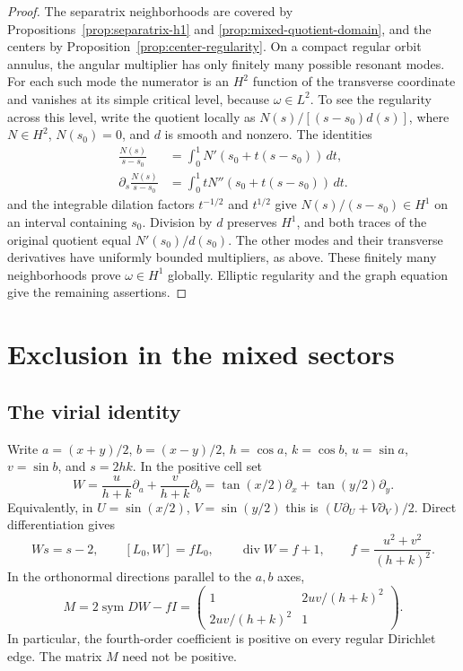 \documentclass[reqno,11pt]{amsart}
\numberwithin{equation}{section}
\theoremstyle{remark}
\begin{document}
\begin{proof}
The separatrix neighborhoods are covered by
Propositions~\ref{prop:separatrix-h1} and
\ref{prop:mixed-quotient-domain}, and the centers by
Proposition~\ref{prop:center-regularity}.
On a compact regular orbit annulus, the angular multiplier has
only finitely many possible resonant modes.
For each such mode the numerator is an $H^2$ function of the
transverse coordinate and vanishes at its simple critical
level, because $\omega\in L^2$.
To see the regularity across this level, write the quotient locally as
$N(s)/[(s-s_0)d(s)]$, where $N\in H^2$, $N(s_0)=0$, and $d$
is smooth and nonzero. The identities
\[
 \begin{aligned}
 \frac{N(s)}{s-s_0}
       &=\int_0^1N'(s_0+t(s-s_0))\,dt,\\
 \partial_s\frac{N(s)}{s-s_0}
       &=\int_0^1tN''(s_0+t(s-s_0))\,dt.
 \end{aligned}
\]
and the integrable dilation factors $t^{-1/2}$ and $t^{1/2}$
give $N(s)/(s-s_0)\in H^1$ on an interval containing $s_0$.
Division by $d$ preserves $H^1$, and both traces of the original
quotient equal $N'(s_0)/d(s_0)$.
The other modes and their transverse derivatives
have uniformly bounded multipliers, as above.
These finitely many neighborhoods prove $\omega\in H^1$
globally.  Elliptic regularity and the graph equation give
the remaining assertions.
\end{proof}


\section{Exclusion in the mixed sectors}
\label{sec:mixed-exclusion}

\subsection{The virial identity}
\label{sec:r5-new-virial}

Write $a=(x+y)/2$, $b=(x-y)/2$, $h=\cos a$, $k=\cos b$,
$u=\sin a$, $v=\sin b$, and $s=2hk$. In the positive cell set
\[
 W=\frac{u}{h+k}\partial_a+\frac{v}{h+k}\partial_b
   =\tan(x/2)\partial_x+\tan(y/2)\partial_y.
\]
Equivalently, in $U=\sin(x/2)$, $V=\sin(y/2)$ this is
$(U\partial_U+V\partial_V)/2$. Direct differentiation gives
\[
 Ws=s-2,\qquad [L_0,W]=fL_0,\qquad
 \operatorname{div}W=f+1,\qquad
 f=\frac{u^2+v^2}{(h+k)^2}.
\]
In the orthonormal directions parallel to the $a,b$ axes,
\[
 M=2\operatorname{sym}DW-fI
   =\begin{pmatrix}1&2uv/(h+k)^2\\2uv/(h+k)^2&1\end{pmatrix}.
\]
In particular, the fourth-order coefficient is positive on every regular
Dirichlet edge. The matrix $M$ need not be positive.
\end{document}
